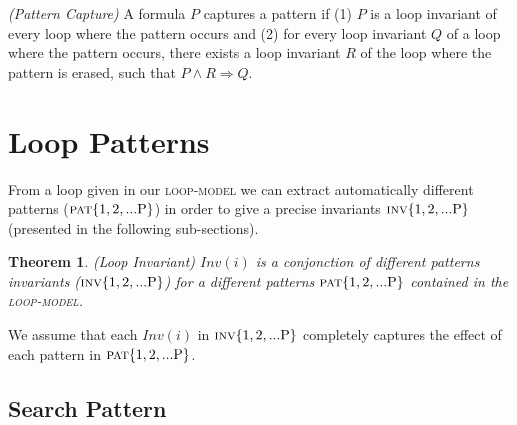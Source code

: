 \documentclass[a4paper,10pt]{article}
\newcommand{\idx}{\ensuremath{i}\xspace}
\newcommand{\impl}{\ensuremath{\Longrightarrow}}
\newcommand{\loopinvariant}{\noindent\textit{Loop invariant:}\xspace}
\newcommand{\patterndef}{\noindent\textit{Definition:}\xspace}
\newcommand{\symdef}{\ensuremath{\overset{\mathit{def}}{=}}}
\newcommand{\Inv}[1]{\ensuremath{\mathit{Inv}(#1)\xspace}}
\newcommand{\loopmodel}{\textsc{loop-model}\xspace}
\newtheorem{theorem}{Theorem}[section]
\newenvironment{proof}[1][Proof.]{\begin{trivlist}
\item[\hskip \labelsep {\bfseries #1}]}{\end{trivlist}}
\newenvironment{definition}[1][Definition]{\begin{trivlist}
\item[\hskip \labelsep {\bfseries #1}]}{\end{trivlist}}
\begin{document}
\begin{definition}
  \emph{(Pattern Capture)} A formula $P$ captures a pattern if (1) $P$ is a
  loop invariant of every loop where the pattern occurs and (2) for every loop
  invariant $Q$ of a loop where the pattern occurs, there exists a loop
  invariant $R$ of the loop where the pattern is erased, such that
  $P \land R \impl Q$.
\label{def:pattern-capture}
\end{definition}


\section{Loop Patterns} 

\newcommand{\curpattern}{\ensuremath{\textsc{pat}\mathrm{\arabic{pc}}}\xspace}
\newcommand{\curinv}{\ensuremath{\textsc{inv}\mathrm{\arabic{pc}}}\xspace}
\newcommand{\anyinv}{\ensuremath{\textsc{inv}\mathrm{x}}\xspace}

\newcommand{\pattern}[3]{%
\refstepcounter{pc}
\patterndef #1
%
\begin{equation}
  #2 \tag{\curpattern}
\end{equation}
%
\loopinvariant
%
\begin{equation}
  \Inv{\idx} \symdef #3 \tag{\curinv}
\end{equation}
}

\newcommand{\allpattern}{\ensuremath{\textsc{pat}\mathrm{\{1,2,...P\}}}\xspace}
\newcommand{\allinv}{\ensuremath{\textsc{inv}\mathrm{\{1,2,...P\}}}\xspace}

From a loop given in our \loopmodel we can extract automatically different patterns (\allpattern) 
in order to give a precise invariants \allinv (presented in the following sub-sections).

\begin{theorem}
  \emph{(Loop Invariant)} \Inv{\idx} is a conjonction of different patterns invariants (\allinv)
  for a different patterns \allpattern contained in the \loopmodel.
\end{theorem}

\begin{proof}
  We assume that each \Inv{\idx} in \allinv completely captures the effect of each pattern in \allpattern.
\end{proof}

\subsection{Search Pattern}
\end{document}
